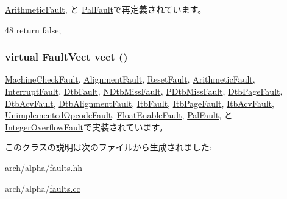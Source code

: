 \hyperlink{classAlphaISA_1_1ArithmeticFault_a4dca22d2e3f19609672fe85bb5e28b56}{ArithmeticFault}, と \hyperlink{classAlphaISA_1_1PalFault_a4dca22d2e3f19609672fe85bb5e28b56}{PalFault}で再定義されています。


\begin{DoxyCode}
48 {return false;}
\end{DoxyCode}
\hypertarget{classAlphaISA_1_1AlphaFault_ac141ef2ab527bd4d5c079ddff2e8b4aa}{
\subsubsection[{vect}]{\setlength{\rightskip}{0pt plus 5cm}virtual {\bf FaultVect} vect ()}}
\label{classAlphaISA_1_1AlphaFault_ac141ef2ab527bd4d5c079ddff2e8b4aa}


\hyperlink{classAlphaISA_1_1MachineCheckFault_ae15c5d7ab0162821b93d668d0b225198}{MachineCheckFault}, \hyperlink{classAlphaISA_1_1AlignmentFault_ae15c5d7ab0162821b93d668d0b225198}{AlignmentFault}, \hyperlink{classAlphaISA_1_1ResetFault_ae15c5d7ab0162821b93d668d0b225198}{ResetFault}, \hyperlink{classAlphaISA_1_1ArithmeticFault_ae15c5d7ab0162821b93d668d0b225198}{ArithmeticFault}, \hyperlink{classAlphaISA_1_1InterruptFault_ae15c5d7ab0162821b93d668d0b225198}{InterruptFault}, \hyperlink{classAlphaISA_1_1DtbFault_ae7a41506fab06a3c1e392f5286f14c66}{DtbFault}, \hyperlink{classAlphaISA_1_1NDtbMissFault_ae15c5d7ab0162821b93d668d0b225198}{NDtbMissFault}, \hyperlink{classAlphaISA_1_1PDtbMissFault_ae15c5d7ab0162821b93d668d0b225198}{PDtbMissFault}, \hyperlink{classAlphaISA_1_1DtbPageFault_ae15c5d7ab0162821b93d668d0b225198}{DtbPageFault}, \hyperlink{classAlphaISA_1_1DtbAcvFault_ae15c5d7ab0162821b93d668d0b225198}{DtbAcvFault}, \hyperlink{classAlphaISA_1_1DtbAlignmentFault_ae15c5d7ab0162821b93d668d0b225198}{DtbAlignmentFault}, \hyperlink{classAlphaISA_1_1ItbFault_ae7a41506fab06a3c1e392f5286f14c66}{ItbFault}, \hyperlink{classAlphaISA_1_1ItbPageFault_ae15c5d7ab0162821b93d668d0b225198}{ItbPageFault}, \hyperlink{classAlphaISA_1_1ItbAcvFault_ae15c5d7ab0162821b93d668d0b225198}{ItbAcvFault}, \hyperlink{classAlphaISA_1_1UnimplementedOpcodeFault_ae15c5d7ab0162821b93d668d0b225198}{UnimplementedOpcodeFault}, \hyperlink{classAlphaISA_1_1FloatEnableFault_ae15c5d7ab0162821b93d668d0b225198}{FloatEnableFault}, \hyperlink{classAlphaISA_1_1PalFault_ae15c5d7ab0162821b93d668d0b225198}{PalFault}, と \hyperlink{classAlphaISA_1_1IntegerOverflowFault_ae15c5d7ab0162821b93d668d0b225198}{IntegerOverflowFault}で実装されています。

このクラスの説明は次のファイルから生成されました:\begin{DoxyCompactItemize}
\item 
arch/alpha/\hyperlink{arch_2alpha_2faults_8hh}{faults.hh}\item 
arch/alpha/\hyperlink{arch_2alpha_2faults_8cc}{faults.cc}\end{DoxyCompactItemize}
